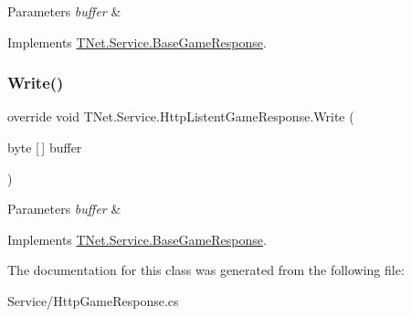 \begin{DoxyParams}{Parameters}
{\em buffer} & \\
\hline
\end{DoxyParams}


Implements \mbox{\hyperlink{class_t_net_1_1_service_1_1_base_game_response_a1e037de4af1a1fee323cc7efbe9cbc3e}{T\+Net.\+Service.\+Base\+Game\+Response}}.

\mbox{\label{class_t_net_1_1_service_1_1_http_listent_game_response_ae8d535287fff26bbf1face8058daec22}} 
\subsubsection{\texorpdfstring{Write()}{Write()}}
{\footnotesize\ttfamily override void T\+Net.\+Service.\+Http\+Listent\+Game\+Response.\+Write (\begin{DoxyParamCaption}\item[{byte \mbox{[}$\,$\mbox{]}}]{buffer }\end{DoxyParamCaption})\hspace{0.3cm}{\ttfamily [virtual]}}






\begin{DoxyParams}{Parameters}
{\em buffer} & \\
\hline
\end{DoxyParams}


Implements \mbox{\hyperlink{class_t_net_1_1_service_1_1_base_game_response_a2ede5b36253063e68dbe5553a95bf1e2}{T\+Net.\+Service.\+Base\+Game\+Response}}.



The documentation for this class was generated from the following file\+:\begin{DoxyCompactItemize}
\item 
Service/Http\+Game\+Response.\+cs\end{DoxyCompactItemize}
